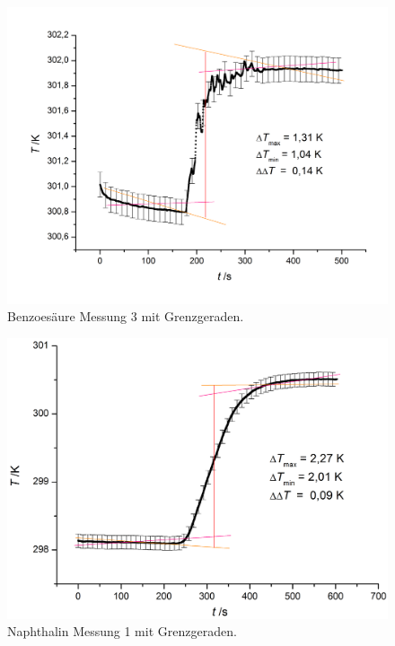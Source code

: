 \documentclass[12pt,a4paper,titlepage,headinclude,bibtotoc]{scrartcl}
\begin{document}
\begin{figure} [h!]
\begin{center}
\includegraphics[scale=0.45]{Benz3Fehler.png} \end{center}
\caption{Benzoesäure Messung 3 mit Grenzgeraden.}
\end{figure}

\begin{figure} [h!]
\begin{center}
\includegraphics[scale=0.45]{Napht1Fehler.png} \end{center}
\caption{Naphthalin Messung 1 mit Grenzgeraden.}
\end{figure}
\end{document}
